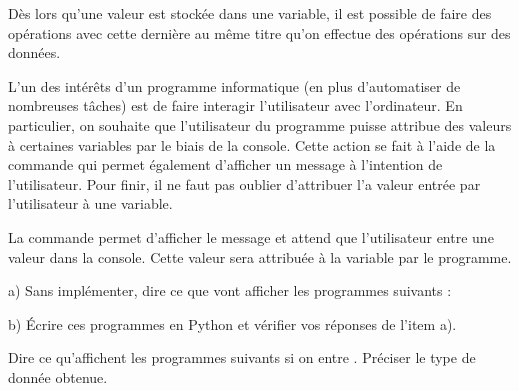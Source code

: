 Dès lors qu'une valeur est stockée dans une variable, il est possible de faire des opérations avec cette dernière au même titre qu'on effectue des opérations sur des données.

\bigskip
L'un des intérêts d'un programme informatique (en plus d'automatiser de nombreuses tâches) est de faire interagir l'utilisateur avec l'ordinateur. En particulier, on souhaite que l'utilisateur du programme puisse attribue des valeurs à certaines variables par le biais de la console. Cette action se fait à l'aide de la commande  qui permet également d'afficher un message à l'intention de l'utilisateur. Pour finir, il ne faut pas oublier d'attribuer l'a valeur entrée par l'utilisateur à une variable.

\bigskip
\begin{exemple}
La commande  permet d'afficher le message  et attend que l'utilisateur entre une valeur dans la console. Cette valeur sera attribuée à la variable  par le programme.
\end{exemple}




\medskip
\begin{boxexstheorieligne}
\exo
a) Sans implémenter, dire ce que vont afficher les programmes suivants :

\hspace{-3mm}
\hspace{-3mm}
\hspace{-3mm}

\medskip
b) Écrire ces programmes en Python et vérifier vos réponses de l'item a).




\eexo




\exo
Dire ce qu'affichent les programmes suivants si on entre . Préciser le type de donnée obtenue.

\vspace*{-2mm}
\begin{center}
\end{center}
\vspace{-5mm}
\end{boxexstheorieligne}



